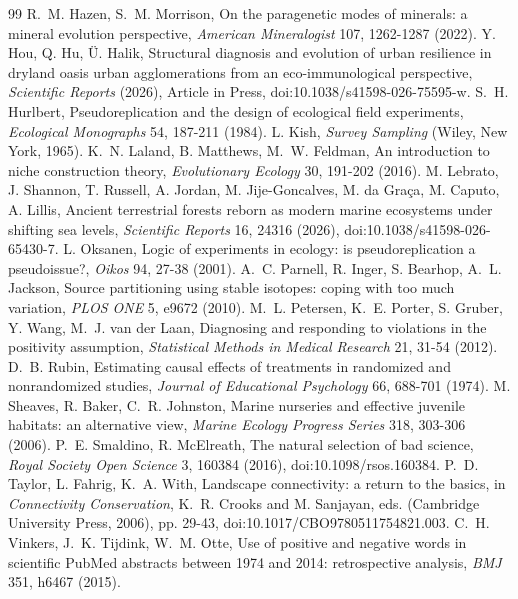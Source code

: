 \documentclass[11pt]{article}
\theoremstyle{definition}
\theoremstyle{remark}
\begin{document}
\begin{thebibliography}{99}
 R.~M. Hazen, S.~M. Morrison, On the paragenetic modes of minerals: a mineral evolution perspective, \emph{American Mineralogist} 107, 1262-1287 (2022).
 Y. Hou, Q. Hu, \"U. Halik, Structural diagnosis and evolution of urban resilience in dryland oasis urban agglomerations from an eco-immunological perspective, \emph{Scientific Reports} (2026), Article in Press, doi:10.1038/s41598-026-75595-w.
 S.~H. Hurlbert, Pseudoreplication and the design of ecological field experiments, \emph{Ecological Monographs} 54, 187-211 (1984).
 L. Kish, \emph{Survey Sampling} (Wiley, New York, 1965).
 K.~N. Laland, B. Matthews, M.~W. Feldman, An introduction to niche construction theory, \emph{Evolutionary Ecology} 30, 191-202 (2016).
 M. Lebrato, J. Shannon, T. Russell, A. Jordan, M. Jije-Goncalves, M. da Gra\c{c}a, M. Caputo, A. Lillis, Ancient terrestrial forests reborn as modern marine ecosystems under shifting sea levels, \emph{Scientific Reports} 16, 24316 (2026), doi:10.1038/s41598-026-65430-7.
 L. Oksanen, Logic of experiments in ecology: is pseudoreplication a pseudoissue?, \emph{Oikos} 94, 27-38 (2001).
 A.~C. Parnell, R. Inger, S. Bearhop, A.~L. Jackson, Source partitioning using stable isotopes: coping with too much variation, \emph{PLOS ONE} 5, e9672 (2010).
 M.~L. Petersen, K.~E. Porter, S. Gruber, Y. Wang, M.~J. van der Laan, Diagnosing and responding to violations in the positivity assumption, \emph{Statistical Methods in Medical Research} 21, 31-54 (2012).
 D.~B. Rubin, Estimating causal effects of treatments in randomized and nonrandomized studies, \emph{Journal of Educational Psychology} 66, 688-701 (1974).
 M. Sheaves, R. Baker, C.~R. Johnston, Marine nurseries and effective juvenile habitats: an alternative view, \emph{Marine Ecology Progress Series} 318, 303-306 (2006).
 P.~E. Smaldino, R. McElreath, The natural selection of bad science, \emph{Royal Society Open Science} 3, 160384 (2016), doi:10.1098/rsos.160384.
 P.~D. Taylor, L. Fahrig, K.~A. With, Landscape connectivity: a return to the basics, in \emph{Connectivity Conservation}, K.~R. Crooks and M. Sanjayan, eds. (Cambridge University Press, 2006), pp. 29-43, doi:10.1017/CBO9780511754821.003.
 C.~H. Vinkers, J.~K. Tijdink, W.~M. Otte, Use of positive and negative words in scientific PubMed abstracts between 1974 and 2014: retrospective analysis, \emph{BMJ} 351, h6467 (2015).
\end{thebibliography}
\end{document}

